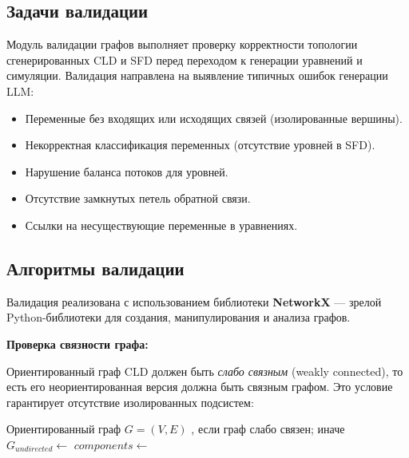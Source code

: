 \subsection{Задачи валидации}

Модуль валидации графов выполняет проверку корректности топологии сгенерированных CLD и SFD перед переходом к генерации уравнений и симуляции. Валидация направлена на выявление типичных ошибок генерации LLM:

\begin{itemize}
    \item Переменные без входящих или исходящих связей (изолированные вершины).
    \item Некорректная классификация переменных (отсутствие уровней в SFD).
    \item Нарушение баланса потоков для уровней.
    \item Отсутствие замкнутых петель обратной связи.
    \item Ссылки на несуществующие переменные в уравнениях.
\end{itemize}

\subsection{Алгоритмы валидации}

Валидация реализована с использованием библиотеки \textbf{NetworkX} \cite{networkx2008} --- зрелой Python-библиотеки для создания, манипулирования и анализа графов.

\textbf{Проверка связности графа:}

Ориентированный граф CLD должен быть \emph{слабо связным} (weakly connected), то есть его неориентированная версия должна быть связным графом. Это условие гарантирует отсутствие изолированных подсистем:

\begin{algorithm}[H]
    \caption{Проверка слабой связности CLD}
    \begin{algorithmic}[1]
        \Require Ориентированный граф $G = (V, E)$
        \Ensure {}, если граф слабо связен;  иначе
        \State $G_{undirected} \gets$ 
        \State $components \gets$ 
            \State \Return {}
        \Else
            \State \Return {}
        \EndIf
    \end{algorithmic}
\end{algorithm}

